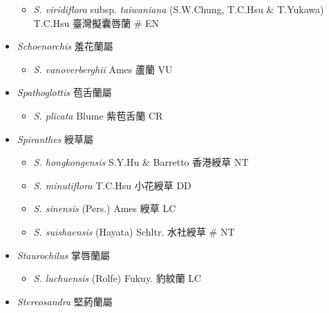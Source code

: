 \begin{itemize}
  \begin{itemize}
        \item[] \textit{S. viridiflora} subsp. \textit{taiwaniana} (S.W.Chung, T.C.Hsu \& T.Yukawa) T.C.Hsu  臺灣擬囊唇蘭  \# EN
  \end{itemize}
 \item[] \textit{Schoenorchis} 羞花蘭屬
                                
  \begin{itemize}
        \item[] \textit{S. vanoverberghii} Ames  蘆蘭   VU
  \end{itemize}
 \item[] \textit{Spathoglottis} 苞舌蘭屬
                                
  \begin{itemize}
        \item[] \textit{S. plicata} Blume  紫苞舌蘭   CR
  \end{itemize}
 \item[] \textit{Spiranthes} 綬草屬
                                
  \begin{itemize}
        \item[] \textit{S. hongkongensis} S.Y.Hu \& Barretto  香港綬草   NT
        \item[] \textit{S. minutiflora} T.C.Hsu  小花綬草   DD
        \item[] \textit{S. sinensis} (Pers.) Ames  綬草   LC
        \item[] \textit{S. suishaensis} (Hayata) Schltr.  水社綬草  \# NT
  \end{itemize}
 \item[] \textit{Staurochilus} 掌唇蘭屬
                                
  \begin{itemize}
        \item[] \textit{S. luchuensis} (Rolfe) Fukuy.  豹紋蘭   LC
  \end{itemize}
 \item[] \textit{Stereosandra} 堅葯蘭屬
                                

\end{itemize}
